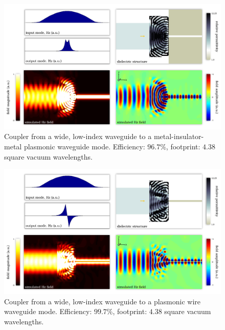 \begin{figure}[h!]
    \centering
    \includegraphics[width=\textwidth]{p3/14}
    \caption{
        Coupler from a wide, low-index waveguide to a
            metal-insulator-metal plasmonic waveguide mode.
        Efficiency: $96.7\%$,
        footprint: $4.38$ square vacuum wavelengths.
        }
\end{figure}
\begin{figure}[h!]
    \centering
    \includegraphics[width=\textwidth]{p3/15}
    \caption{
        Coupler from a wide, low-index waveguide to a
            plasmonic wire waveguide mode.
        Efficiency: $99.7\%$,
        footprint: $4.38$ square vacuum wavelengths.
        }
\end{figure}
\clearpage

